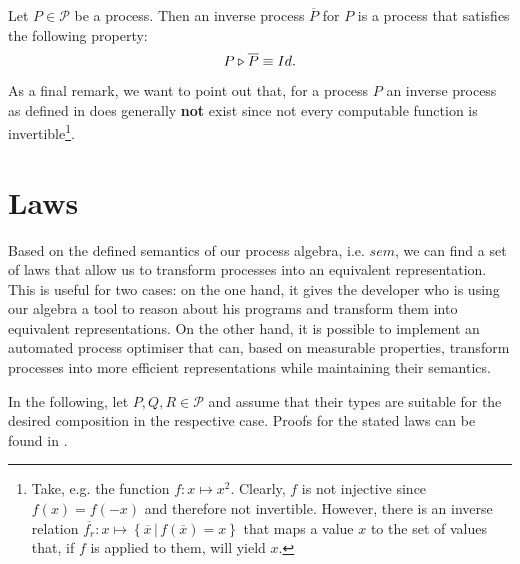 \begin{definition}
\label{def:inverse_process}
Let $P \in \mathcal{P}$ be a process. Then an inverse process $\overline{P}$ for $P$ is a process that satisfies the following property:
  \begin{equation}
    P \triangleright \overline{P} \equiv Id.
  \end{equation}
  \hfill\qedsymbol
\end{definition}



As a final remark, we want to point out that, for a process $P$ an inverse process as defined in  does generally \textbf{not} exist since not every computable function is invertible\footnote{Take, e.g. the function $f \colon x \mapsto x^2$. Clearly, $f$ is not injective since $f \left( x \right) = f \left( -x \right)$ and therefore not invertible. However, there is an inverse relation $\overline{f_r} \colon x \mapsto \left\{ \overline{x} \,|\, f \left( \overline{x} \right) = x \right\}$ that maps a value $x$ to the set of values that, if $f$ is applied to them, will yield $x$.}.






\section{Laws}
\label{chp:laws}
Based on the defined semantics of our process algebra, i.e. $sem$, we can find a set of laws that allow us to transform processes into an equivalent representation. This is useful for two cases: on the one hand, it gives the developer who is using our algebra a tool to reason about his programs and transform them into equivalent representations. On the other hand, it is possible to implement an automated process optimiser that can, based on measurable properties, transform processes into more efficient representations while maintaining their semantics.

In the following, let $P, Q, R \in \mathcal{P}$ and assume that their types are suitable for the desired composition in the respective case. Proofs for the stated laws can be found in .

